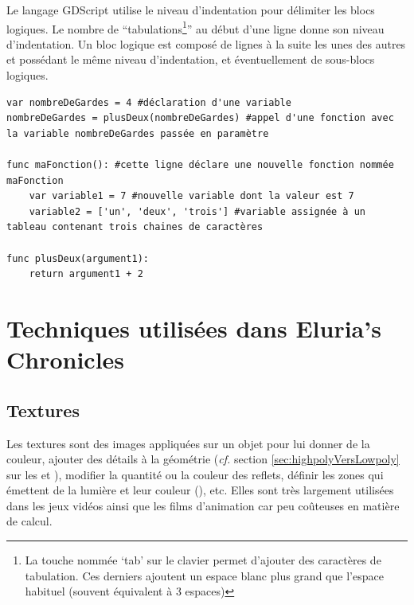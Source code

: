 Le langage GDScript utilise le niveau d'indentation pour délimiter les blocs logiques. Le nombre de \enquote{tabulations\footnote{La touche nommée \enquote{tab} sur le clavier permet d'ajouter des caractères de tabulation. Ces derniers ajoutent un espace blanc plus grand que l'espace habituel (souvent équivalent à 3 espaces)}} au début d'une ligne donne son niveau d'indentation. Un bloc logique est composé de lignes à la suite les unes des autres et possédant le même niveau d'indentation, et éventuellement de sous-blocs logiques.


\renewcommand{\codeTitle}{Les bases de GDScript}
\begin{lstlisting}[caption=basics.gd]
var nombreDeGardes = 4 #déclaration d'une variable
nombreDeGardes = plusDeux(nombreDeGardes) #appel d'une fonction avec la variable nombreDeGardes passée en paramètre

func maFonction(): #cette ligne déclare une nouvelle fonction nommée maFonction
	var variable1 = 7 #nouvelle variable dont la valeur est 7
	variable2 = ['un', 'deux', 'trois'] #variable assignée à un tableau contenant trois chaines de caractères

func plusDeux(argument1):
	return argument1 + 2
\end{lstlisting}




\section{Techniques utilisées dans {Eluria's Chronicles}}
\subsection{Textures}
\label{sec:textures}
Les textures sont des images appliquées sur un objet pour lui donner de la couleur, ajouter des détails à la géométrie (\textit{cf.} section \ref{sec:highpolyVersLowpoly} sur les  et  ), modifier la quantité ou la couleur des reflets, définir les zones qui émettent de la lumière et leur couleur (), etc. Elles sont très largement utilisées dans les jeux vidéos ainsi que les films d'animation car peu coûteuses en matière de calcul.

